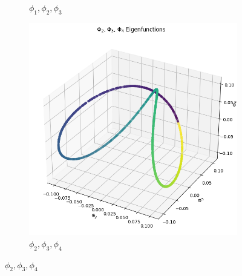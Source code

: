 \begin{figure}[H]
\begin{subfigure}{.28\textwidth}
        \caption{$\phi_1, \phi_2, \phi_3$}
    \end{subfigure}%
    \begin{subfigure}{.28\textwidth}
        \includegraphics[width=\linewidth]{images/ex3_task2_part3_3D_3.png}
        \caption{$\phi_2, \phi_3, \phi_4$ }
    \end{subfigure}

    \medskip


\end{figure}
